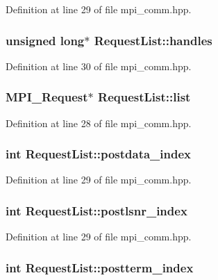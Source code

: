 Definition at line 29 of file mpi\_\-comm.hpp.\hypertarget{struct_request_list_a3c4b479196e905405bfdc0d725f38e58}{
\subsubsection[{handles}]{\setlength{\rightskip}{0pt plus 5cm}unsigned long$\ast$ {\bf RequestList::handles}}}
\label{struct_request_list_a3c4b479196e905405bfdc0d725f38e58}


Definition at line 30 of file mpi\_\-comm.hpp.\hypertarget{struct_request_list_aa0fc1062a01a1aa73a508753d0494440}{
\subsubsection[{list}]{\setlength{\rightskip}{0pt plus 5cm}MPI\_\-Request$\ast$ {\bf RequestList::list}}}
\label{struct_request_list_aa0fc1062a01a1aa73a508753d0494440}


Definition at line 28 of file mpi\_\-comm.hpp.\hypertarget{struct_request_list_a5e3f719f39f59af21a9cf9bacd22d841}{
\subsubsection[{postdata\_\-index}]{\setlength{\rightskip}{0pt plus 5cm}int {\bf RequestList::postdata\_\-index}}}
\label{struct_request_list_a5e3f719f39f59af21a9cf9bacd22d841}


Definition at line 29 of file mpi\_\-comm.hpp.\hypertarget{struct_request_list_ac88b4b8c36839d39d107391f6ff001b7}{
\subsubsection[{postlsnr\_\-index}]{\setlength{\rightskip}{0pt plus 5cm}int {\bf RequestList::postlsnr\_\-index}}}
\label{struct_request_list_ac88b4b8c36839d39d107391f6ff001b7}


Definition at line 29 of file mpi\_\-comm.hpp.\hypertarget{struct_request_list_af44ba88ef3315eba9fdd58efcf4315d1}{
\subsubsection[{postterm\_\-index}]{\setlength{\rightskip}{0pt plus 5cm}int {\bf RequestList::postterm\_\-index}}}
\label{struct_request_list_af44ba88ef3315eba9fdd58efcf4315d1}


